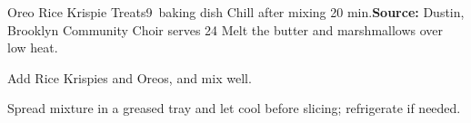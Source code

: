 \begin{recipe}{Oreo Rice Krispie Treats}{9\inch{}\inch\ baking dish \hfill Chill after mixing \hfill 20 min.}{\textbf{Source:}  Dustin, Brooklyn Community Choir \hfill serves 24}
 Melt the butter and marshmallows over low heat.

 Add Rice Krispies and Oreos, and mix well.

 \newstep Spread mixture in a greased tray and let cool before slicing; refrigerate if needed.
\end{recipe}

